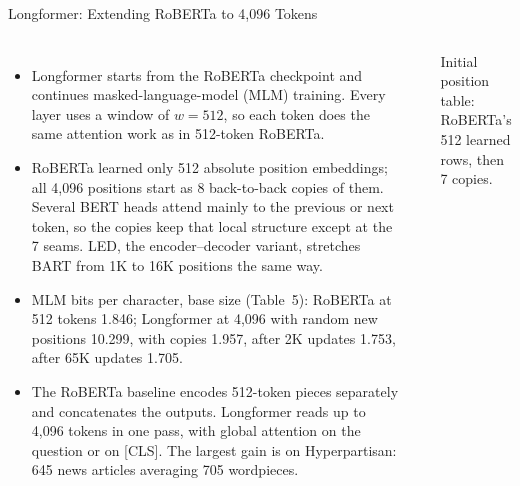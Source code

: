 \begin{frame}{Longformer: Extending RoBERTa to 4,096 Tokens}
  \begin{columns}[T,onlytextwidth]
      \begin{itemize}\footnotesize\itemsep0.25em
        \item[\textcolor{red}{$\blacktriangleright$}] Longformer starts from the RoBERTa checkpoint and continues masked-language-model (MLM) training. Every layer uses a window of $w = 512$, so each token does the same attention work as in 512-token RoBERTa.
        \item[\textcolor{red}{$\blacktriangleright$}] RoBERTa learned only 512 absolute position embeddings; all 4,096 positions start as 8 back-to-back copies of them. Several BERT heads attend mainly to the previous or next token, so the copies keep that local structure except at the 7 seams. LED, the encoder--decoder variant, stretches BART from 1K to 16K positions the same way.
        \item[\textcolor{red}{$\blacktriangleright$}] MLM bits per character, base size (Table~5): RoBERTa at 512 tokens 1.846; Longformer at 4,096 with random new positions 10.299, with copies 1.957, after 2K updates 1.753, after 65K updates 1.705.
        \item[\textcolor{red}{$\blacktriangleright$}] The RoBERTa baseline encodes 512-token pieces separately and concatenates the outputs. Longformer reads up to 4,096 tokens in one pass, with global attention on the question or on [CLS]. The largest gain is on Hyperpartisan: 645 news articles averaging 705 wordpieces.
      \end{itemize}
      \centering
      \vspace{0.6em}
      \\[0.3em]
      {\scriptsize Initial position table: RoBERTa's 512 learned rows, then 7 copies.\par}

\end{columns}
\end{frame}
